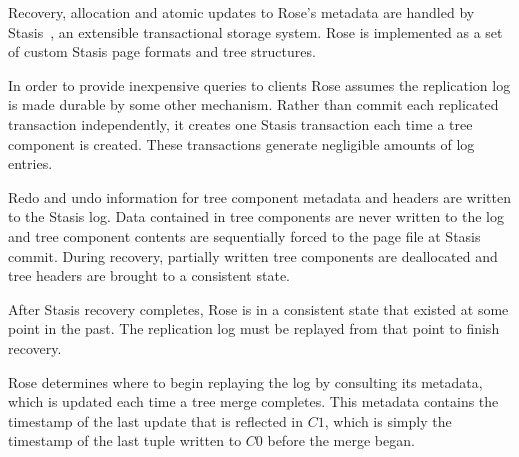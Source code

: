 \documentclass{vldb}
\newcommand{\rows}{Rose\xspace}
\newcommand{\rowss}{Rose's\xspace}
\begin{document}
Recovery, allocation and atomic updates to \rowss metadata are
handled by Stasis~\cite{stasis}, an extensible transactional storage
system.  \rows is implemented as a set of custom Stasis page formats
and tree structures.

In order to provide inexpensive  queries to clients
\rows assumes the replication log is made durable by some other
mechanism.  Rather than commit each replicated transaction
independently, it creates one Stasis transaction each time a tree
component is created.  These transactions generate negligible amounts of log
entries.

Redo and undo information for tree component metadata and headers are
written to the Stasis log.  Data contained in tree components are
never written to the log and tree component contents are sequentially
forced to the page file at Stasis commit.  During recovery,
partially written tree components are deallocated and tree headers are
brought to a consistent state.

After Stasis recovery completes, \rows is in a consistent state that
existed at some point in the past.  The replication log must be
replayed from that point to finish recovery.

\rows determines where to begin replaying the log by consulting its
metadata, which is updated each time a tree merge
completes.  This metadata contains the timestamp of the last update
that is reflected in $C1$, which is simply the timestamp of the
last tuple written to $C0$ before the merge began.




\end{document}
